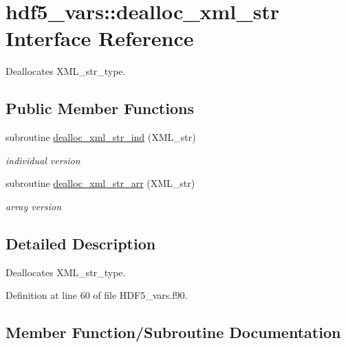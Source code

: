 \hypertarget{interfacehdf5__vars_1_1dealloc__xml__str}{}\section{hdf5\+\_\+vars\+:\+:dealloc\+\_\+xml\+\_\+str Interface Reference}
\label{interfacehdf5__vars_1_1dealloc__xml__str}


Deallocates X\+M\+L\+\_\+str\+\_\+type.  


\subsection*{Public Member Functions}
\begin{DoxyCompactItemize}
\item 
subroutine \hyperlink{interfacehdf5__vars_1_1dealloc__xml__str_aaff3913b2711c58eaeb3b02a50569213}{dealloc\+\_\+xml\+\_\+str\+\_\+ind} (X\+M\+L\+\_\+str)
\begin{DoxyCompactList}\small\item\em individual version \end{DoxyCompactList}\item 
subroutine \hyperlink{interfacehdf5__vars_1_1dealloc__xml__str_ac232ad876f9ca8d15a3fae38ca1ac917}{dealloc\+\_\+xml\+\_\+str\+\_\+arr} (X\+M\+L\+\_\+str)
\begin{DoxyCompactList}\small\item\em array version \end{DoxyCompactList}\end{DoxyCompactItemize}


\subsection{Detailed Description}
Deallocates X\+M\+L\+\_\+str\+\_\+type. 

Definition at line 60 of file H\+D\+F5\+\_\+vars.\+f90.



\subsection{Member Function/\+Subroutine Documentation}
\mbox{\label{interfacehdf5__vars_1_1dealloc__xml__str_ac232ad876f9ca8d15a3fae38ca1ac917}} 
